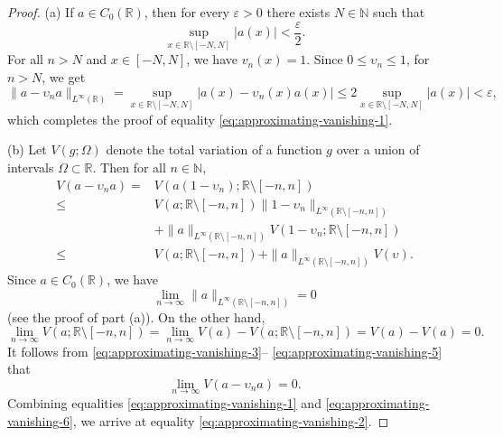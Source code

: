 \documentclass[reqno]{amsproc}
\newcommand{\eps}{\varepsilon}
\newcommand{\N}{\mathbb{N}}
\newcommand{\R}{\mathbb{R}}
\theoremstyle{definition}
\theoremstyle{remark}
\numberwithin{equation}{section}
\begin{document}
\begin{proof}
(a) If $a\in C_0(\R)$, then for every $\eps>0$ there exists $N\in\N$
such that 
\[
\sup_{x\in\R\setminus[-N,N]}|a(x)|<\frac{\eps}{2}.
\]
For all $n>N$ and $x\in[-N,N]$, we have $v_n(x)=1$. Since $0\le\upsilon_n\le 1$,
for $n>N$, we get
\[
\|a-\upsilon_n a\|_{L^\infty(\R)}=
\sup_{x\in\R\setminus[-N,N]}|a(x)-\upsilon_n(x)a(x)|
\le 2\sup_{x\in\R\setminus[-N,N]}|a(x)|<\eps,
\]
which completes the proof of equality \eqref{eq:approximating-vanishing-1}.

(b) Let $V(g;\Omega)$ denote the total variation of a function $g$ 
over a union of intervals $\Omega \subset \mathbb{R}$. Then for all $n\in\N$,
\begin{align}
V(a - \upsilon_n a) 
=& 
V(a(1 - \upsilon_n);\mathbb{R}\setminus [-n, n]) 
\nonumber\\
\le & 
V(a;\mathbb{R}\setminus [-n, n]) 
\|1 - \upsilon_n\|_{L^\infty(\mathbb{R}\setminus [-n, n])} 
\nonumber\\
&+ 
\|a\|_{L^\infty(\mathbb{R}\setminus [-n, n])} 
V(1 - \upsilon_n;\mathbb{R}\setminus [-n, n]) 
\nonumber\\
\le & 
V(a;\mathbb{R}\setminus [-n, n]) 
+ 
\|a\|_{L^\infty(\mathbb{R}\setminus [-n, n])} V(\upsilon).
\label{eq:approximating-vanishing-3}
\end{align}
Since $a\in C_0(\R)$, we have
\begin{equation}\label{eq:approximating-vanishing-4}
\lim_{n\to\infty}\|a\|_{L^\infty(\R\setminus[-n,n])}=0
\end{equation}
(see the proof of part (a)).
On the other hand,
\begin{equation}\label{eq:approximating-vanishing-5}
\lim_{n\to\infty}V(a;\mathbb{R}\setminus [-n, n])
=\lim_{n\to\infty}V(a)-V(a;\R\setminus[-n,n])=V(a)-V(a)=0.
\end{equation}
It follows from \eqref{eq:approximating-vanishing-3}--%
\eqref{eq:approximating-vanishing-5} that
\begin{equation}\label{eq:approximating-vanishing-6}
\lim_{n\to\infty}V(a-\upsilon_n a)=0.
\end{equation}
Combining equalities \eqref{eq:approximating-vanishing-1}
and \eqref{eq:approximating-vanishing-6},
we arrive at equality \eqref{eq:approximating-vanishing-2}.
\end{proof}
\end{document}
